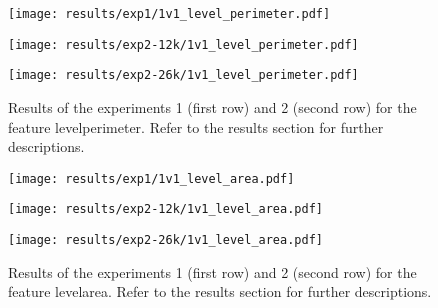 \begin{figure}[h!]
	\centering
	\begin{minipage}{0.4\linewidth}
		\texttt{[image: results/exp1/1v1\_level\_perimeter.pdf]}
	\end{minipage}
	
	\begin{minipage}{0.4\linewidth}
		\texttt{[image: results/exp2-12k/1v1\_level\_perimeter.pdf]}
	\end{minipage}
	\begin{minipage}{0.4\linewidth}
		\texttt{[image: results/exp2-26k/1v1\_level\_perimeter.pdf]}
	\end{minipage}
	
	\caption[ Results: Feature level\textunderscore perimeter]{ Results of the experiments 1 (first row) and 2 (second row) for the feature level\textunderscore perimeter. Refer to the results section for further descriptions. }
	\label{fig:appendix_level_perimeter}
\end{figure}
\newpage 


\begin{figure}[h!]
	\centering
	\begin{minipage}{0.4\linewidth}
		\texttt{[image: results/exp1/1v1\_level\_area.pdf]}
	\end{minipage}
	
	\begin{minipage}{0.4\linewidth}
		\texttt{[image: results/exp2-12k/1v1\_level\_area.pdf]}
	\end{minipage}
	\begin{minipage}{0.4\linewidth}
		\texttt{[image: results/exp2-26k/1v1\_level\_area.pdf]}
	\end{minipage}
	
	\caption[ Results: Feature level\textunderscore area]{ Results of the experiments 1 (first row) and 2 (second row) for the feature level\textunderscore area. Refer to the results section for further descriptions. }
	\label{fig:appendix_level_area}
\end{figure}

